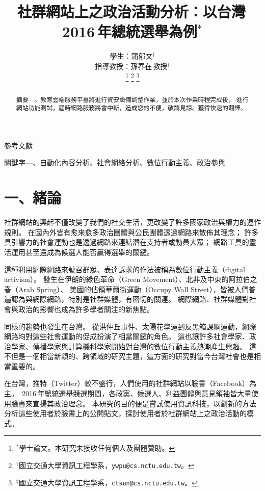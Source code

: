 \documentclass[letterpaper, 10pt, conference]{ieeeconf}   %
\title{\LARGE \bf
社群網站上之政治活動分析：以台灣\,2016\,年總統選舉為例$^{\ast}$
}
\author{\parbox{3 in}{\centering 學生：蒲郁文$^{\dagger}$}
        \hspace*{0.5 in}
        \parbox{3 in}{\centering 指導教授：孫春在\,教授$^{\ddagger}$}
        \thanks{$^{\ast}$學士論文。本研究未接收任何個人及團體贊助。}
        \thanks{$^{\dagger}$國立交通大學資訊工程學系，{\tt\small ywpu@cs.nctu.edu.tw}。}
        \thanks{$^{\ddagger}$國立交通大學資訊工程學系，{\tt\small ctsun@cs.nctu.edu.tw}。}
}
\begin{document}
\begin{CJK*}{UTF8}{bsmi}
\onehalfspacing
\refname{參考文獻}

\maketitle
\thispagestyle{empty}
\pagestyle{empty}


\begin{abstract}
摘要\enskip---。教育雲端服務平臺將進行資安設備調整作業，並於本次作業時程完成後，
進行網站功能測試，屆時網路服務將會中斷，造成您的不便，敬請見諒。獲得快速的翻譯。
\end{abstract}

\begin{keywords}
關鍵字\enskip---、自動化內容分析、社會網絡分析、數位行動主義、政治參與
\end{keywords}


\section*{一、緒論}

社群網站的興起不僅改變了我們的社交生活，更改變了許多國家政治與權力的運作規則。
在國內外皆有愈來愈多政治團體與公民團體透過網路來散佈其理念；
許多具引響力的社會運動也是透過網路來連結潛在支持者或動員大眾；
網路工具的靈活運用甚至還成為候選人能否贏得選舉的關鍵。

這種利用網際網路來號召群眾、表達訴求的作法被稱為數位行動主義（digital activism）。
發生在伊朗的綠色革命（Green Movement）、北非及中東的阿拉伯之春（Arab Spring）、
美國的佔領華爾街運動（Occupy Wall Street），皆被人們普遍認為與網際網路，特別是社群媒體，有密切的關連。
網際網路、社群媒體對社會與政治的影響也成為許多學者關注的新焦點。

同樣的趨勢也發生在台灣。
從洪仲丘事件、太陽花學運到反黑箱課綱運動，網際網路均對這些社會運動的促成扮演了相當關鍵的角色。
這也讓許多社會學家、政治學家、傳播學家與計算機科學家開始對台灣的數位行動主義熱潮產生興趣。
這不但是一個相當新穎的、跨領域的研究主題，這方面的研究對當今台灣社會也是相當重要的。

在台灣，推特（Twitter）較不盛行，人們使用的社群網站以臉書（Facebook）為主。
\,2016\,年總統選舉競選期間，各政黨、候選人、利益團體與意見領袖皆大量使用臉書來宣揚其政治理念。
本研究的目的便是嘗試使用資訊科技，以創新的方法分析這些使用者於臉書上的公開貼文，探討使用者於社群網站上之政治活動的模式。


\end{CJK*}
\end{document}
